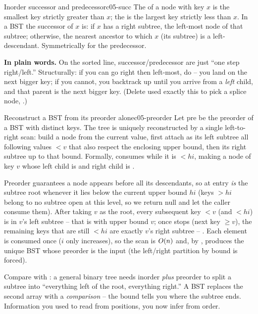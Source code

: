 \begin{definition}{Inorder successor and predecessor}{c05-succ}
The  of a node with key $x$ is the smallest key strictly greater than $x$;
the  is the largest key strictly less than $x$. In a BST the successor of $x$ is:
if $x$ has a right subtree, the left-most node of that subtree; otherwise, the nearest ancestor to
which $x$ (its subtree) is a left-descendant. Symmetrically for the predecessor.
\end{definition}

\noindent\textbf{In plain words.} On the sorted line, successor/predecessor are just ``one step
right/left.'' Structurally: if you can go right then left-most, do -- you land on the next bigger
key; if you cannot, you backtrack up until you arrive from a \emph{left} child, and that parent is the
next bigger key. (Delete used exactly this to pick a splice node, .)

\begin{theorem}{Reconstruct a BST from its preorder alone}{c05-preorder}
Let $\mathrm{pre}$ be the preorder of a BST with distinct keys. The tree is uniquely reconstructed by
a single left-to-right scan: build a node from the current value, first attach as its left subtree all
following values $<v$ that also respect the enclosing upper bound, then its right subtree up to that
bound. Formally,  consumes  while it is $<\mathit{hi}$, making a node of
key $v$ whose left child is  and right child is .
\end{theorem}
\begin{proofbox}
Preorder guarantees a node appears before all its descendants, so  at entry \emph{is} the
subtree root whenever it lies below the current upper bound $\mathit{hi}$ (keys $>\mathit{hi}$ belong
to no subtree open at this level, so we return null and let the caller consume them). After taking
$v$ as the root, every subsequent key $<v$ (and $<\mathit{hi}$) is in $v$'s left subtree -- that is
 with upper bound $v$; once  stops (next key $\ge v$), the remaining
keys that are still $<\mathit{hi}$ are exactly $v$'s right subtree -- . Each element is
consumed once ($i$ only increases), so the scan is $O(n)$ and, by , produces the
unique BST whose preorder is the input (the left/right partition by bound is forced). \end{proofbox}
\begin{insightbox}
Compare with : a general binary tree needs inorder \emph{plus} preorder to
split a subtree into ``everything left of the root, everything right.'' A BST replaces the second
array with a \emph{comparison} -- the bound tells you where the subtree ends. Information you used to
read from positions, you now infer from order.
\end{insightbox}

